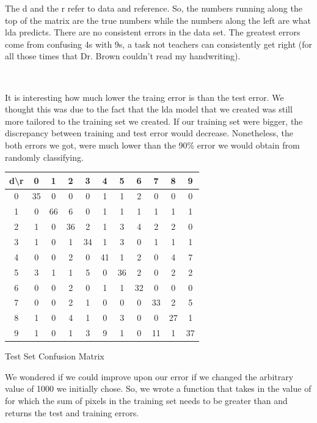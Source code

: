 \documentclass[10pt]{extarticle}
\begin{document}
\begin{minipage}{.09\textwidth}
	\quad
\end{minipage}	
\begin{minipage}{.35\textwidth}
The d and the r refer to data and reference. So, the numbers running along the top of the matrix are the true numbers while the numbers along the left are what lda predicts. There are no consistent errors in the data set. The greatest errors come from confusing 4s with 9s, a task not teachers can consistently get right (for all those times that Dr. Brown couldn't read my handwriting).
\end{minipage}\\
\begin{minipage}{.45\textwidth}
	It is interesting how much lower the traing error is than the test error. We thought this was due to the fact that the lda model that we created was still more tailored to the training set we created. If our training set were bigger, the discrepancy between training and test error would decrease. Nonetheless, the both errors we got, were much lower than the 90\% error we would obtain from randomly classifying.
\end{minipage}
\begin{minipage}{.05\textwidth}
	\quad
\end{minipage}
\begin{minipage}{.5\textwidth}
	\begin{center}
	\begin{tabular}{c | c c c c c c c c c c}
		d\textbackslash r & 0 & 1 & 2 & 3 & 4 & 5 & 6 & 7 & 8 & 9\\ \hline
		0&35&0&0&0&1&1&2&0&0&0\\
		1&0&66&6&0&1&1&1&1&1&1\\
		2&1&0&36&2&1&3&4&2&2&0\\
		3&1&0&1&34&1&3&0&1&1&1\\
		4&0&0&2&0&41&1&2&0&4&7\\
		5&3&1&1&5&0&36&2&0&2&2\\
		6&0&0&2&0&1&1&32&0&0&0\\
		7&0&0&2&1&0&0&0&33&2&5\\
		8&1&0&4&1&0&3&0&0&27&1\\
		9&1&0&1&3&9&1&0&11&1&37\\
	\end{tabular}
	\bigskip
	Test Set Confusion Matrix
	\end{center}
\end{minipage}	
We wondered if we could improve upon our error if we changed the arbitrary value of 1000 we initially chose. So, we wrote a function that takes in the value of for which the sum of pixels in the training set needs to be greater than and returns the test and training errors.\\\\\\
\end{document}
